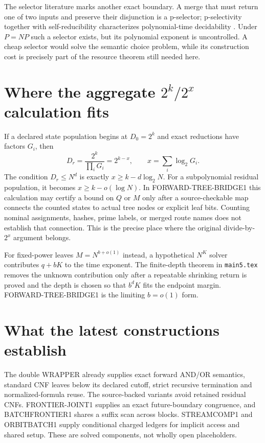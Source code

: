 \documentclass[11pt]{article}
\begin{document}
The selector literature marks another exact boundary.  A merge that must
return one of two inputs and preserve their disjunction is a p-selector;
p-selectivity together with self-reducibility characterizes polynomial-time
decidability \cite{buhrmantorenvliet1996}.  Under $P=NP$ such a selector
exists, but its polynomial exponent is uncontrolled.  A cheap selector would
solve the semantic choice problem, while its construction cost is precisely
part of the resource theorem still needed here.

\section{Where the aggregate $2^k/2^x$ calculation fits}
If a declared state population begins at $D_0=2^k$ and exact reductions have
factors $G_i$, then
\[
 D_r=\frac{2^k}{\prod_iG_i}=2^{k-x},\qquad
 x=\sum_i\log_2G_i.
\]
The condition $D_r\le N^d$ is exactly
$x\ge k-d\log_2N$.  For a subpolynomial residual population, it becomes
$x\ge k-o(\log N)$.  In FORWARD-TREE-BRIDGE1 this calculation may certify a
bound on $Q$ or $M$ only after a source-checkable map connects the counted
states to actual tree nodes or explicit leaf bits.  Counting nominal
assignments, hashes, prime labels, or merged route names does not establish
that connection.  This is the precise place where the original divide-by-
$2^x$ argument belongs.

For fixed-power leaves $M=N^{b+o(1)}$ instead, a hypothetical $N^K$ solver
contributes $q+bK$ to the time exponent.  The finite-depth theorem in
\texttt{main5.tex} removes the unknown contribution only after a repeatable
shrinking return is proved and the depth is chosen so that $b^dK$ fits the
endpoint margin.  FORWARD-TREE-BRIDGE1 is the limiting $b=o(1)$ form.

\section{What the latest constructions establish}
The double WRAPPER already supplies exact forward AND/OR semantics, standard
CNF leaves below its declared cutoff, strict recursive termination and
normalized-formula reuse.  The source-backed variants avoid retained residual
CNFs.  FRONTIER-JOINT1 supplies an exact future-boundary congruence, and
BATCHFRONTIER1 shares a suffix scan across blocks.  STREAMCOMP1 and
ORBITBATCH1 supply conditional charged ledgers for implicit access and shared
setup.  These are solved components, not wholly open placeholders.
\end{document}
